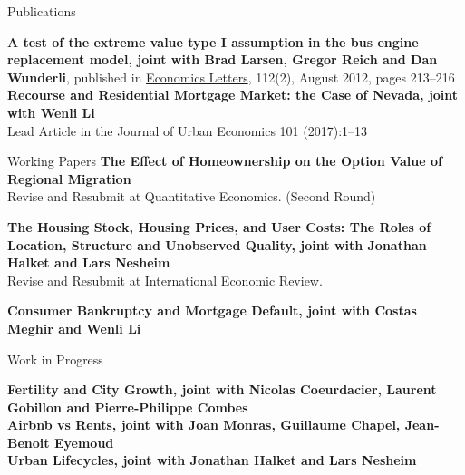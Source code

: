 \documentclass{cvjobmarket} %
\begin{document}
\newpage


\begin{rSection}{Publications}

{\textbf{A test of the extreme value type I assumption in the bus engine replacement model, joint with Brad Larsen, Gregor Reich and Dan Wunderli}, published in \href{http://www.sciencedirect.com/science/article/pii/S0165176512000870}{Economics Letters}, 112(2), August 2012, pages 213--216}\\ 


{\textbf{Recourse and Residential Mortgage Market: the Case of Nevada, joint with Wenli Li}} \\
{Lead Article in the Journal of Urban Economics 101 (2017):1–13}

\end{rSection}

\begin{rSection}{Working Papers}
{\textbf{The Effect of Homeownership on the Option Value of Regional Migration}}\\
{Revise and Resubmit at Quantitative Economics. (Second Round)}

{\textbf{The Housing Stock, Housing Prices, and User Costs: The Roles of Location, Structure and Unobserved Quality, joint with Jonathan Halket and Lars Nesheim}} \\
{Revise and Resubmit at International Economic Review.}

{\textbf{Consumer Bankruptcy and Mortgage Default, joint with Costas Meghir and Wenli Li}} \\



\end{rSection}
\begin{rSection}{Work in Progress}

{\textbf{Fertility and City Growth, joint with Nicolas Coeurdacier, Laurent Gobillon and Pierre-Philippe Combes}} \\

{\textbf{Airbnb vs Rents, joint with Joan Monras, Guillaume Chapel, Jean-Benoit Eyemoud}} \\

{\textbf{Urban Lifecycles, joint with Jonathan Halket and Lars Nesheim}} \\

\end{rSection}
\end{document}
